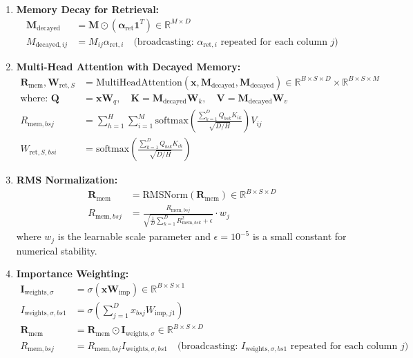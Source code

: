 \documentclass{article}
\begin{document}
\begin{enumerate}
\item \textbf{Memory Decay for Retrieval:}
\begin{align}
\mathbf{M}_{\text{decayed}} &= \mathbf{M} \odot (\boldsymbol{\alpha}_{\text{ret}} \mathbf{1}^T) \in \mathbb{R}^{M \times D} \\
M_{\text{decayed},ij} &= M_{ij} \alpha_{\text{ret},i} \quad \text{(broadcasting: $\alpha_{\text{ret},i}$ repeated for each column $j$)}
\end{align}

\item \textbf{Multi-Head Attention with Decayed Memory:}
\begin{align}
\mathbf{R}_{\text{mem}}, \mathbf{W}_{\text{ret},S} &= \text{MultiHeadAttention}(\mathbf{x}, \mathbf{M}_{\text{decayed}}, \mathbf{M}_{\text{decayed}}) \in \mathbb{R}^{B \times S \times D} \times \mathbb{R}^{B \times S \times M} \\
\text{where: } \mathbf{Q} &= \mathbf{x} \mathbf{W}_q, \quad \mathbf{K} = \mathbf{M}_{\text{decayed}} \mathbf{W}_k, \quad \mathbf{V} = \mathbf{M}_{\text{decayed}} \mathbf{W}_v \\
R_{\text{mem},bsj} &= \sum_{h=1}^{H} \sum_{i=1}^{M} \text{softmax}\left(\frac{\sum_{k=1}^{D} Q_{bsk} K_{ik}}{\sqrt{D/H}}\right) V_{ij} \\
W_{\text{ret},S,bsi} &= \text{softmax}\left(\frac{\sum_{k=1}^{D} Q_{bsk} K_{ik}}{\sqrt{D/H}}\right)
\end{align}

\item \textbf{RMS Normalization:}
\begin{align}
\mathbf{R}_{\text{mem}} &= \text{RMSNorm}(\mathbf{R}_{\text{mem}}) \in \mathbb{R}^{B \times S \times D} \\
R_{\text{mem},bsj} &= \frac{R_{\text{mem},bsj}}{\sqrt{\frac{1}{D}\sum_{k=1}^{D} R_{\text{mem},bsk}^2 + \epsilon}} \cdot w_j
\end{align}
where $w_j$ is the learnable scale parameter and $\epsilon = 10^{-5}$ is a small constant for numerical stability.

\item \textbf{Importance Weighting:}
\begin{align}
\mathbf{I}_{\text{weights},\sigma} &= \sigma(\mathbf{x} \mathbf{W}_{\text{imp}}) \in \mathbb{R}^{B \times S \times 1} \\
I_{\text{weights},\sigma,bs1} &= \sigma\left(\sum_{j=1}^{D} x_{bsj} W_{\text{imp},j1}\right) \\
\mathbf{R}_{\text{mem}} &= \mathbf{R}_{\text{mem}} \odot \mathbf{I}_{\text{weights},\sigma} \in \mathbb{R}^{B \times S \times D} \\
R_{\text{mem},bsj} &= R_{\text{mem},bsj} I_{\text{weights},\sigma,bs1} \quad \text{(broadcasting: $I_{\text{weights},\sigma,bs1}$ repeated for each column $j$)}
\end{align}


\end{enumerate}
\end{document}
